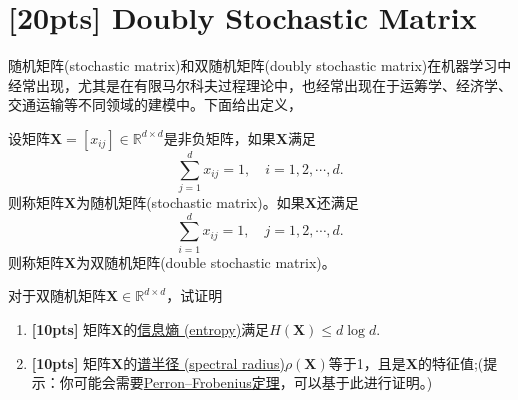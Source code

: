 \documentclass[a4paper,UTF8]{article}
\numberwithin{equation}{section}
\begin{document}
\section{[20pts] Doubly Stochastic Matrix}
随机矩阵(stochastic matrix)和双随机矩阵(doubly stochastic matrix)在机器学习中经常出现，尤其是在有限马尔科夫过程理论中，也经常出现在于运筹学、经济学、交通运输等不同领域的建模中。下面给出定义，
\begin{def-box}[随机矩阵]
设矩阵$\mathbf{X}=[x_{ij}]\in \mathbb{R}^{d\times d}$是非负矩阵，如果$\mathbf{X}$满足
\begin{equation}
\label{eq-sto-matrix}
\sum_{j=1}^d x_{ij} = 1,\quad i=1,2,\cdots,d.
\end{equation}
则称矩阵$\mathbf{X}$为随机矩阵(stochastic matrix)。如果$\mathbf{X}$还满足
\begin{equation}
\label{eq-double-sto-matrix}
\sum_{i=1}^d x_{ij} = 1,\quad j=1,2,\cdots,d.
\end{equation}
则称矩阵$\mathbf{X}$为双随机矩阵(double stochastic matrix)。
\end{def-box}
对于双随机矩阵$\mathbf{X} \in \mathbb{R}^{d\times d}$，试证明
\begin{enumerate}[ {(}1{)}]
\item \textbf{[10pts]} 矩阵$\mathbf{X}$的\href{https://en.wikipedia.org/wiki/Entropy_(information_theory)}{信息熵 (entropy)}满足$H(\mathbf{X}) \leq d\log d$.
\item \textbf{[10pts]} 矩阵$\mathbf{X}$的\href{https://en.wikipedia.org/wiki/Spectral_radius}{谱半径 (spectral radius)}$\rho(\mathbf{X})$等于1，且是$\mathbf{X}$的特征值;(提示：你可能会需要\href{https://en.wikipedia.org/wiki/Perron%E2%80%93Frobenius_theorem}{Perron–Frobenius定理}，可以基于此进行证明。)
\end{enumerate}
\end{document}
